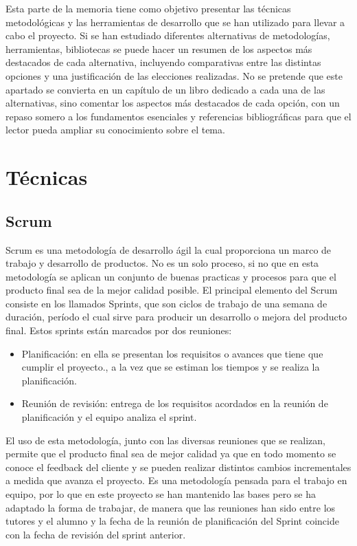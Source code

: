 
Esta parte de la memoria tiene como objetivo presentar las técnicas metodológicas y las herramientas de desarrollo que se han utilizado para llevar a cabo el proyecto. Si se han estudiado diferentes alternativas de metodologías, herramientas, bibliotecas se puede hacer un resumen de los aspectos más destacados de cada alternativa, incluyendo comparativas entre las distintas opciones y una justificación de las elecciones realizadas. 
No se pretende que este apartado se convierta en un capítulo de un libro dedicado a cada una de las alternativas, sino comentar los aspectos más destacados de cada opción, con un repaso somero a los fundamentos esenciales y referencias bibliográficas para que el lector pueda ampliar su conocimiento sobre el tema.

\section{Técnicas}

\subsection{Scrum}
Scrum es una metodología de desarrollo ágil la cual proporciona un marco de trabajo y desarrollo de productos. No es un solo proceso, si no que en esta metodología se aplican un conjunto de buenas practicas y procesos para que el producto final sea de la mejor calidad posible.
El principal elemento del Scrum consiste en los llamados Sprints, que son ciclos de trabajo de una semana de duración, período el cual sirve para producir un desarrollo o mejora del producto final. Estos sprints están marcados por dos reuniones:
\begin{itemize}
	\item Planificación: en ella se presentan los requisitos o avances que tiene que cumplir el proyecto., a la vez que se estiman los tiempos y se realiza la planificación.
	\item Reunión de revisión: entrega de los requisitos acordados en la reunión de planificación y el equipo analiza el sprint.
\end{itemize}
El uso de esta metodología, junto con las diversas reuniones que se realizan, permite que el producto final sea de mejor calidad ya que en todo momento se conoce el feedback del cliente y se pueden realizar distintos cambios incrementales a medida que avanza el proyecto.
Es una metodología pensada para el trabajo en equipo, por lo que en este proyecto se han mantenido las bases pero se ha adaptado la forma de trabajar, de manera que las reuniones han sido entre los tutores y el alumno y la fecha de la reunión de planificación del Sprint coincide con la fecha de revisión del sprint anterior.


